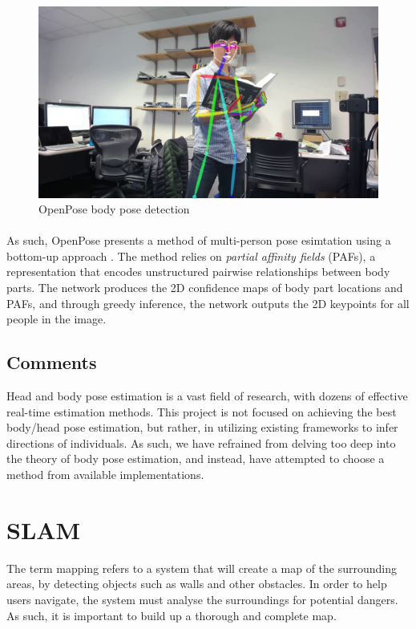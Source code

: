 \begin{figure}[ht]
	\centering
	\includegraphics[width=.7\linewidth]{img/chapter2_background/openpose.jpg}
	\caption{OpenPose body pose detection \cite{Cao2017}}
\end{figure}

\paragraph{} As such, OpenPose presents a method of multi-person pose esimtation using a bottom-up approach \cite{Cao2017}. The method relies on \textit{partial affinity fields} (PAFs), a representation that encodes unstructured pairwise relationships between body parts. The network produces the 2D confidence maps of body part locations and PAFs, and through greedy inference, the network outputs the 2D keypoints for all people in the image.

\subsection{Comments}
Head and body pose estimation is a vast field of research, with dozens of effective real-time estimation methods. This project is not focused on achieving the best body/head pose estimation, but rather, in utilizing existing frameworks to infer directions of individuals. As such, we have refrained from delving too deep into the theory of body pose estimation, and instead, have attempted to choose a method from available implementations.

\section{SLAM}
The term mapping refers to a system that will create a map of the surrounding areas, by detecting objects such as walls and other obstacles. In order to help users navigate, the system must analyse the surroundings for potential dangers. As such, it is important to build up a thorough and complete map.

